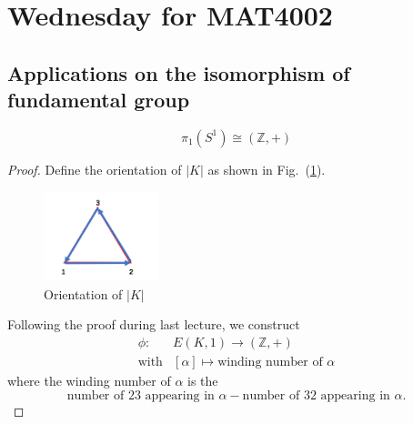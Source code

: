 \section{Wednesday for MAT4002}
\subsection{Applications on the isomorphism of fundamental group}

\begin{theorem}
\[
\pi_1(S^1)\cong(\mathbb{Z},+)
\]
\end{theorem}
\begin{proof}
Define the orientation of $|K|$ as shown in Fig.~(\ref{fig:13:8}).
\begin{figure}[H]
\centering
\includegraphics[width=0.3\textwidth]{week13/f_30}
\caption{Orientation of $|K|$
} 
\label{fig:13:8}
\end{figure}
Following the proof during last lecture, we construct 
\[
\begin{array}{ll}\phi:
&E(K,1)\to (\mathbb{Z},+)\\\text{with}&[\alpha]\mapsto
\text{winding number of $\alpha$}
\end{array}
\]
where the winding number of $\alpha$ is the 
\[
\text{number of 23 appearing in $\alpha$} - \text{number of 32 appearing in $\alpha$}.
\]


\end{proof}
